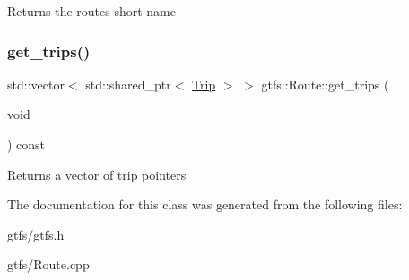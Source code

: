 \begin{DoxyReturn}{Returns}
the route\textquotesingle{}s short name 
\end{DoxyReturn}
\mbox{\label{classgtfs_1_1Route_a763ea7a09f20972019198515da6a1c05}} 
\subsubsection{\texorpdfstring{get\+\_\+trips()}{get\_trips()}}
{\footnotesize\ttfamily std\+::vector$<$ std\+::shared\+\_\+ptr$<$ \hyperlink{classgtfs_1_1Trip}{Trip} $>$ $>$ gtfs\+::\+Route\+::get\+\_\+trips (\begin{DoxyParamCaption}\item[{void}]{ }\end{DoxyParamCaption}) const}

\begin{DoxyReturn}{Returns}
a vector of trip pointers 
\end{DoxyReturn}


The documentation for this class was generated from the following files\+:\begin{DoxyCompactItemize}
\item 
gtfs/gtfs.\+h\item 
gtfs/Route.\+cpp\end{DoxyCompactItemize}
